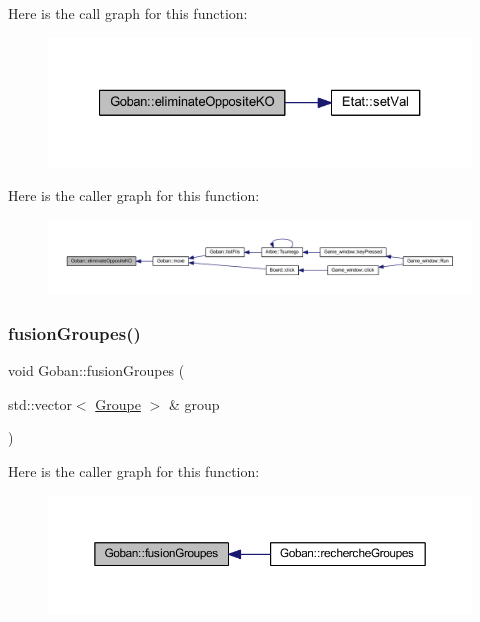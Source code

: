 Here is the call graph for this function\+:\nopagebreak
\begin{figure}[H]
\begin{center}
\leavevmode
\includegraphics[width=327pt]{class_goban_a6c4b62a9469b3876d250ab94bcd562e5_cgraph}
\end{center}
\end{figure}
Here is the caller graph for this function\+:\nopagebreak
\begin{figure}[H]
\begin{center}
\leavevmode
\includegraphics[width=350pt]{class_goban_a6c4b62a9469b3876d250ab94bcd562e5_icgraph}
\end{center}
\end{figure}
\mbox{\label{class_goban_abc771312b6931c4217285ee1b306e51b}} 
\subsubsection{\texorpdfstring{fusion\+Groupes()}{fusionGroupes()}}
{\footnotesize\ttfamily void Goban\+::fusion\+Groupes (\begin{DoxyParamCaption}\item[{std\+::vector$<$ \hyperlink{class_groupe}{Groupe} $>$ \&}]{group }\end{DoxyParamCaption})}

Here is the caller graph for this function\+:\nopagebreak
\begin{figure}[H]
\begin{center}
\leavevmode
\includegraphics[width=350pt]{class_goban_abc771312b6931c4217285ee1b306e51b_icgraph}
\end{center}
\end{figure}
\mbox{\label{class_goban_a6b13aeeebc07fddc6a0e4557b90adc7d}} 
